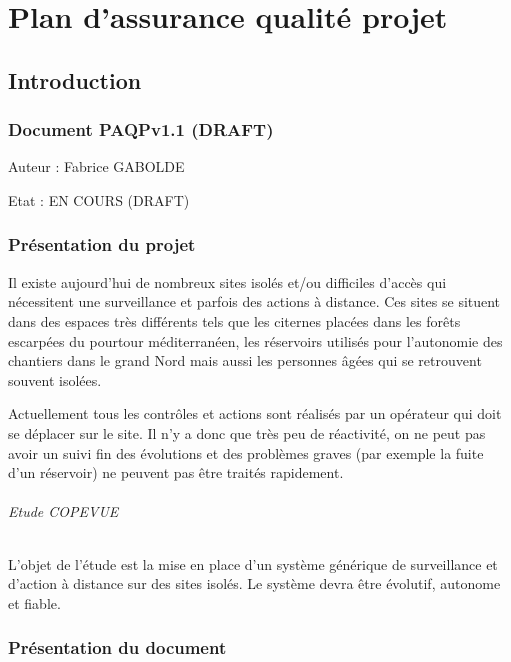 

\renewcommand\docname{PAQPv1.1 (DRAFT)}
\renewcommand\docauthor{Fabrice GABOLDE}
\renewcommand\docstatus{EN COURS (DRAFT)}
\part{Plan d'assurance qualité projet}

\chapter{Introduction}

\section*{Document \docname{}}

Auteur : \docauthor{}

Etat : \docstatus{}

\section{Présentation du projet}

Il existe aujourd'hui de nombreux sites isolés et/ou difficiles d'accès qui nécessitent une surveillance et parfois des actions à distance. Ces sites se situent dans des espaces très différents tels que les citernes placées dans les forêts escarpées du pourtour méditerranéen, les réservoirs utilisés pour l'autonomie des chantiers dans le grand Nord mais aussi les personnes âgées qui se retrouvent souvent isolées.

Actuellement tous les contrôles et actions sont réalisés par un opérateur qui doit se déplacer sur le site. Il n'y a donc que très peu de réactivité, on ne peut pas avoir un suivi fin des évolutions et des problèmes graves (par exemple la fuite d'un réservoir) ne peuvent pas être traités rapidement.

\paragraph{Etude COPEVUE}
L'objet de l'étude est la mise en place d'un système générique de surveillance et d'action à distance sur des sites isolés. Le système devra être évolutif, autonome et fiable.

\section{Présentation du document}

